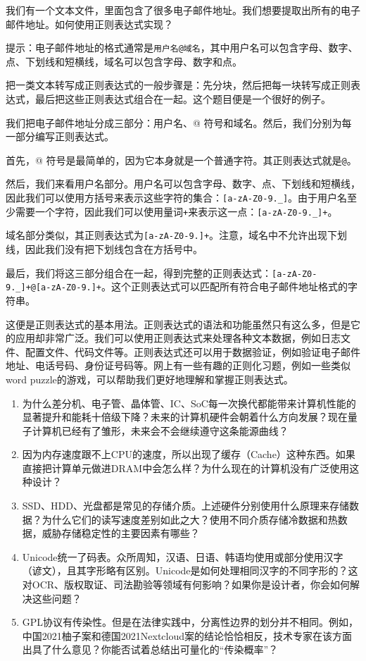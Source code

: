 \begin{example}
  我们有一个文本文件，里面包含了很多电子邮件地址。我们想要提取出所有的电子邮件地址。如何使用正则表达式实现？

  提示：电子邮件地址的格式通常是\texttt{用户名@域名}，其中用户名可以包含字母、数字、点、下划线和短横线，域名可以包含字母、数字和点。
\end{example}

\begin{answer}
  把一类文本转写成正则表达式的一般步骤是：先分块，然后把每一块转写成正则表达式，最后把这些正则表达式组合在一起。这个题目便是一个很好的例子。

  我们把电子邮件地址分成三部分：用户名、@ 符号和域名。然后，我们分别为每一部分编写正则表达式。

  首先，@ 符号是最简单的，因为它本身就是一个普通字符。其正则表达式就是\texttt{@}。

  然后，我们来看用户名部分。用户名可以包含字母、数字、点、下划线和短横线，因此我们可以使用方括号来表示这些字符的集合：\texttt{[a-zA-Z0-9.\_\-]}。由于用户名至少需要一个字符，因此我们可以使用量词\texttt{+}来表示这一点：\texttt{[a-zA-Z0-9.\_\-]+}。

  域名部分类似，其正则表达式为\texttt{[a-zA-Z0-9.\-]+}。注意，域名中不允许出现下划线，因此我们没有把下划线包含在方括号中。

  最后，我们将这三部分组合在一起，得到完整的正则表达式：\texttt{[a-zA-Z0-9.\_\-]+@[a-zA-Z0-9.\-]+}。这个正则表达式可以匹配所有符合电子邮件地址格式的字符串。
\end{answer}

这便是正则表达式的基本用法。正则表达式的语法和功能虽然只有这么多，但是它的应用却非常广泛。我们可以使用正则表达式来处理各种文本数据，例如日志文件、配置文件、代码文件等。正则表达式还可以用于数据验证，例如验证电子邮件地址、电话号码、身份证号码等。网上有一些有趣的正则化习题，例如一些类似word puzzle的游戏，可以帮助我们更好地理解和掌握正则表达式。

\begin{thinking}
\begin{enumerate}
  \item 为什么差分机、电子管、晶体管、IC、SoC每一次换代都能带来计算机性能的显著提升和能耗十倍级下降？未来的计算机硬件会朝着什么方向发展？现在量子计算机已经有了雏形，未来会不会继续遵守这条能源曲线？
  \item 因为内存速度跟不上CPU的速度，所以出现了缓存（Cache）这种东西。如果直接把计算单元做进DRAM中会怎么样？为什么现在的计算机没有广泛使用这种设计？
  \item SSD、HDD、光盘都是常见的存储介质。上述硬件分别使用什么原理来存储数据？为什么它们的读写速度差别如此之大？使用不同介质存储冷数据和热数据，威胁存储稳定性的主要因素有哪些？
  \item Unicode统一了码表。众所周知，汉语、日语、韩语均使用或部分使用汉字（谚文），且其字形略有区别。Unicode是如何处理相同汉字的不同字形的？这对OCR、版权取证、司法勘验等领域有何影响？如果你是设计者，你会如何解决这些问题？
  \item GPL协议有传染性。但是在法律实践中，分离性边界的划分并不相同。例如，中国2021柚子案和德国2021Nextcloud案的结论恰恰相反，技术专家在该方面出具了什么意见？你能否试着总结出可量化的“传染概率”？
\end{enumerate}
\end{thinking}